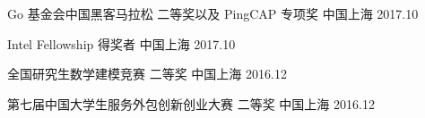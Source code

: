 
\begin{cvhonors}

  \cvhonor
    {Go 基金会中国黑客⻢拉松} %
    {二等奖以及 PingCAP 专项奖} %
    {中国上海} %
    {2017.10} %

  \cvhonor
    {Intel Fellowship} %
    {得奖者} %
    {中国上海} %
    {2017.10} %

  \cvhonor
    {全国研究生数学建模竞赛} %
    {二等奖} %
    {中国上海} %
    {2016.12} %

  \cvhonor
    {第七届中国大学生服务外包创新创业大赛} %
    {二等奖} %
    {中国上海} %
    {2016.12} %
\end{cvhonors}
